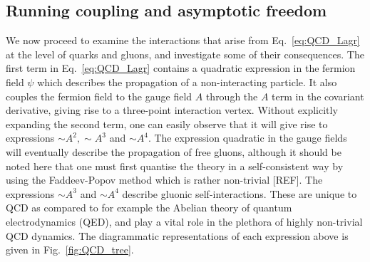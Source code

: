 \documentclass[12pt, a4paper, twoside]{book}
\begin{document}
\subsection{Running coupling and asymptotic freedom}
We now proceed to examine the interactions that arise from Eq.~\eqref{eq:QCD_Lagr} at the level of quarks and gluons, and investigate some of their consequences. The first term in Eq.~\eqref{eq:QCD_Lagr} contains a quadratic expression in the fermion field \(\psi\) which describes the propagation of a non-interacting particle. It also couples the fermion field to the gauge field \(A\) through the \(A\) term in the covariant derivative, giving rise to a three-point interaction vertex. Without explicitly expanding the second term, one can easily observe that it will give rise to expressions \(\sim\!A^2, \sim\!A^3\) and \(\sim\!A^4\). The expression quadratic in the gauge fields will eventually describe the propagation of free gluons, although it should be noted here that one must first quantise the theory in a self-consistent way by using the Faddeev-Popov method which is rather non-trivial [REF]. The expressions \(\sim\!A^3\) and \(\sim\!A^4\) describe gluonic self-interactions. These are unique to QCD as compared to for example the Abelian theory of quantum electrodynamics (QED), and play a vital role in the plethora of highly non-trivial QCD dynamics. The diagrammatic representations of each expression above is given in Fig.~\ref{fig:QCD_tree}. 
\end{document}
